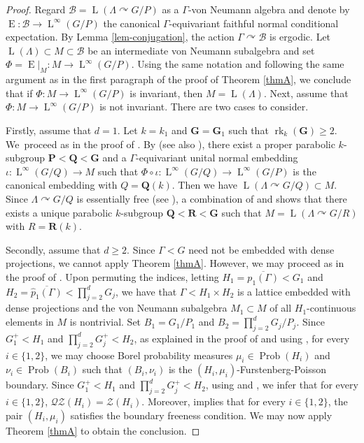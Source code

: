 \documentclass[JEP,XML,SOM,Unicode,published]{cedram}
\newcommand{\bG}{\boldsymbol{G}}
\newcommand{\bP}{\boldsymbol{P}}
\newcommand{\bQ}{\boldsymbol{Q}}
\newcommand{\bR}{\boldsymbol{R}}
\theoremstyle{definition}
\DeclareMathOperator{\Prob}{Prob}
\DeclareMathOperator{\rk}{rk}
\DeclareMathOperator{\rE}{ E}
\DeclareMathOperator{\rL}{L}
\begin{document}
\begin{proof}
Regard $\mathscr B = \rL(\Lambda \curvearrowright G/P)$ as a $\Gamma$-von Neumann algebra and denote by \hbox{$\rE : \mathscr B \to \rL^\infty(G/P)$} the canonical $\Gamma$-equivariant faithful normal conditional expectation. By Lemma \ref{lem-conjugation}, the action $\Gamma \curvearrowright \mathscr B$ is ergodic. Let $\rL(\Lambda) \subset M \subset \mathscr B$ be an intermediate von Neumann subalgebra and set $\Phi = \rE|_M : M \to \rL^\infty(G/P)$. \hbox{Using} the same notation and following the same argument as in the first paragraph of the proof of Theorem \ref{thmA}, we conclude that if $\Phi : M \to \rL^\infty(G/P)$ is invariant, then $M = \rL(\Lambda)$. Next, assume that $\Phi : M \to \rL^\infty(G/P)$ is not invariant. There are two cases to consider.

Firstly, assume that $d = 1$. Let $k = k_1$ and $\bG = \bG_1$ such that $\rk_k(\bG) \geq 2$. We~proceed as in the proof of \cite[Th.\,D]{BBH21}. By \cite[Th.\,5.4]{BBH21} (see also \cite[Th.\,B]{BH19}), there exist a proper parabolic $k$-subgroup $\bP < \bQ < \bG$ and a $\Gamma$-equivariant unital normal embedding $\iota : \rL^\infty(G/Q) \to M$ such that $\Phi \circ \iota : \rL^\infty(G/Q) \to \rL^\infty(G/P)$ is the canonical embedding with $Q = \bQ(k)$. Then we have $\rL(\Lambda \curvearrowright G/Q) \subset M$. Since $\Lambda \curvearrowright G/Q$ is essentially free (see \cite[Lem.\,6.2]{BBHP20}), a combination of \cite[Th.\,IV.2.11]{Ma91} and \cite[Th.\,3.6]{Su18} shows that there exists a unique parabolic $k$-subgroup $\bQ < \bR < \bG$ such that $M = \rL(\Lambda \curvearrowright G/R)$ with $R = \bR(k)$.

Secondly, assume that $d \geq 2$. Since $\Gamma < G$ need not be embedded with dense projections, we cannot apply Theorem \ref{thmA}. However, we may proceed as in the proof of \cite[Prop.\,6.1]{BBHP20}. Upon permuting the indices, letting $H_1 = \overline{p_1(\Gamma)} < G_1$ and $H_2 = \overline{\widehat p_1(\Gamma)} < \prod_{j = 2}^d G_j$, we have that $\Gamma < H_1 \times H_2$ is a lattice embedded with dense projections and the von Neumann subalgebra $M_1 \subset M$ of all $H_1$-continuous elements in $M$ is nontrivial. Set $B_1 = G_1/P_1$ and $B_2 = \prod_{j = 2}^d G_j/P_j$. Since $G_1^+ < H_1$ and $\prod_{j = 2}^d G_j^+ < H_2$, as explained in the proof of \cite[Prop.\,6.1]{BBHP20} and using \cite[Cor.\,5.2]{BS04}, for every $i \in \{1, 2\}$, we may choose Borel probability measures $\mu_i \in \Prob(H_i)$ and $\nu_i \in \Prob(B_i)$ such that $(B_i, \nu_i)$ is the $(H_i, \mu_i)$-Furstenberg-Poisson boundary. Since $G_1^+ < H_1$ and $\prod_{j = 2}^d G_j^+ < H_2$, using \cite[Th.\,I.1.5.6(i)]{Ma91} and \cite[Prop.\,4.3]{CM08}, we infer that for every $i \in \{1, 2\}$, $\mathscr{Q}\mathscr{Z}(H_i) = \mathscr Z(H_i)$. Moreover, \cite[Lem.\,6.2]{BBHP20} implies that for every $i \in \{1, 2\}$, the pair $(H_i, \mu_i)$ satisfies the boundary freeness condition. We may now apply Theorem \ref{thmA} to obtain the conclusion.


\end{proof}
\end{document}
